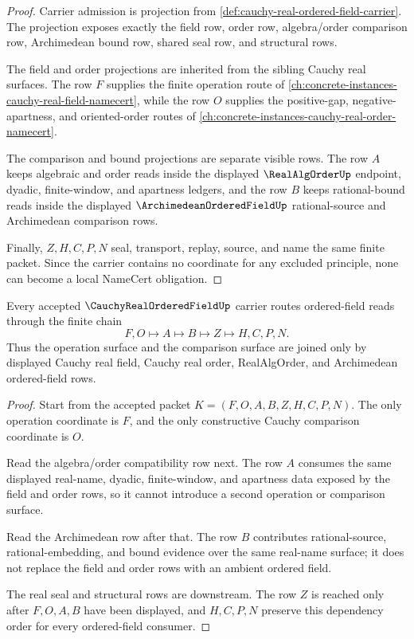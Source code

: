 \begin{proof}
Carrier admission is projection from \autoref{def:cauchy-real-ordered-field-carrier}. The projection exposes exactly the field row, order row, algebra/order comparison row, Archimedean bound row, shared seal row, and structural rows.

The field and order projections are inherited from the sibling Cauchy real surfaces. The row $F$ supplies the finite operation route of \autoref{ch:concrete-instances-cauchy-real-field-namecert}, while the row $O$ supplies the positive-gap, negative-apartness, and oriented-order routes of \autoref{ch:concrete-instances-cauchy-real-order-namecert}.

The comparison and bound projections are separate visible rows. The row $A$ keeps algebraic and order reads inside the displayed $\RealAlgOrderUp$ endpoint, dyadic, finite-window, and apartness ledgers, and the row $B$ keeps rational-bound reads inside the displayed $\ArchimedeanOrderedFieldUp$ rational-source and Archimedean comparison rows.

Finally, $Z,H,C,P,N$ seal, transport, replay, source, and name the same finite packet. Since the carrier contains no coordinate for any excluded principle, none can become a local NameCert obligation.
\end{proof}

\begin{theorem}
\label{thm:cauchy-real-ordered-field-order-field-route}
Every accepted $\CauchyRealOrderedFieldUp$ carrier routes ordered-field reads through the finite chain
$$
F,O \longmapsto A \longmapsto B \longmapsto Z \longmapsto H,C,P,N .
$$
Thus the operation surface and the comparison surface are joined only by displayed Cauchy real field, Cauchy real order, RealAlgOrder, and Archimedean ordered-field rows.
\end{theorem}
\begin{proof}
Start from the accepted packet $K=(F,O,A,B,Z,H,C,P,N)$. The only operation coordinate is $F$, and the only constructive Cauchy comparison coordinate is $O$.

Read the algebra/order compatibility row next. The row $A$ consumes the same displayed real-name, dyadic, finite-window, and apartness data exposed by the field and order rows, so it cannot introduce a second operation or comparison surface.

Read the Archimedean row after that. The row $B$ contributes rational-source, rational-embedding, and bound evidence over the same real-name surface; it does not replace the field and order rows with an ambient ordered field.

The real seal and structural rows are downstream. The row $Z$ is reached only after $F,O,A,B$ have been displayed, and $H,C,P,N$ preserve this dependency order for every ordered-field consumer.
\end{proof}

